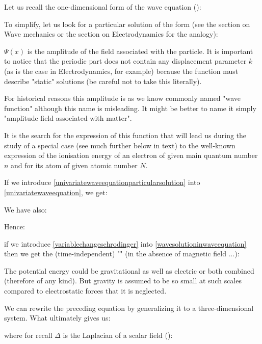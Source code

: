 	Let us recall the one-dimensional form of the wave equation ():
	
	To simplify, let us look for a particular solution of the form (see the section on Wave mechanics or the section on Electrodynamics for the analogy):
	
	$\Psi(x)$ is the amplitude of the field associated with the particle. It is important to notice that the periodic part does not contain any displacement parameter $k$ (as is the case in Electrodynamics, for example) because the function must describe "static" solutions (be careful not to take this literally).
	
	For historical reasons this amplitude is as we know commonly named "wave function" although this name is misleading. It might be better to name it simply "amplitude field associated with matter".
	
	It is the search for the expression of this function that will lead us during the study of a special case (see much further below in text) to the well-known expression of the ionisation energy of an electron of given main quantum number $n$ and for its atom of given atomic number $N$.
	
	If we introduce \ref{univariatewaveequationparticularsolution} into \ref{univariatewaveequation}, we get:
	
	We have also:
	
	
	Hence:
	
	if we introduce \ref{variablechangeschrodinger} into \ref{wavesolutioninwaveequation} then we get the (time-independent) "\label{classical one dimensional schrodinger equation}" (in the absence of magnetic field ...):
	
	\begin{tcolorbox}[title=Remark,colframe=black,arc=10pt]
	The potential energy could be gravitational as well as electric or both combined (therefore of any kind). But gravity is assumed to be so small at such scales compared to electrostatic forces that it is neglected.
	\end{tcolorbox}
	We can rewrite the preceding equation by generalizing it to a three-dimensional system. What ultimately gives us:
	
	where for recall $\Delta$ is the Laplacian of a scalar field ():
	
